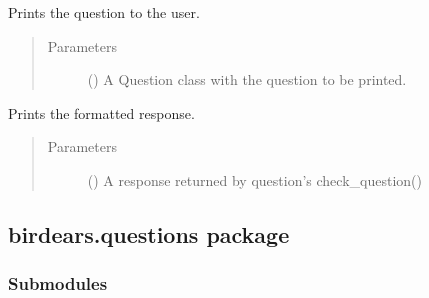 \documentclass[letterpaper,10pt,english]{sphinxmanual}
\begin{document}

\begin{fulllineitems}
\label{\detokenize{birdears.interfaces:birdears.interfaces.commandline.print_question}}
Prints the question to the user.
\begin{quote}\begin{description}
\item[{Parameters}] \leavevmode
{} () \textendash{} A Question class with the question to be printed.

\end{description}\end{quote}

\end{fulllineitems}


\begin{fulllineitems}
\label{\detokenize{birdears.interfaces:birdears.interfaces.commandline.print_response}}
Prints the formatted response.
\begin{quote}\begin{description}
\item[{Parameters}] \leavevmode
{} () \textendash{} A response returned by question’s check\_question()

\end{description}\end{quote}

\end{fulllineitems}



\subsection{birdears.questions package}
\label{\detokenize{birdears.questions::doc}}\label{\detokenize{birdears.questions:birdears-questions-package}}\label{\detokenize{birdears.questions:module-birdears.questions}}

\subsubsection{Submodules}
\label{\detokenize{birdears.questions:submodules}}
\end{document}
